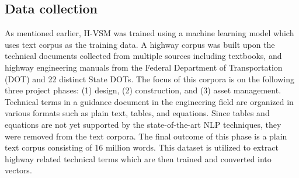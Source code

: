 \documentclass[Journal, InsideFigs, DoubleSpace]{ascelike} %
\begin{document}
\subsection{Data collection}
As mentioned earlier, H-VSM was trained using a machine learning model which uses text corpus as the training data. A highway corpus was built upon the technical documents collected from multiple sources including textbooks, and highway engineering manuals from the Federal Department of Transportation (DOT) and 22 distinct State DOTs. The focus of this corpora is on the following three project phases: (1) design, (2) construction, and (3) asset management. Technical terms in a guidance document in the engineering field are organized in various formats such as plain text, tables, and equations. Since tables and equations are not yet supported by the state-of-the-art NLP techniques, they were removed from the text corpora. The final outcome of this phase is a plain text corpus consisting of 16 million words. This dataset is utilized to extract highway related technical terms which are then trained and converted into vectors.
%
\end{document}
